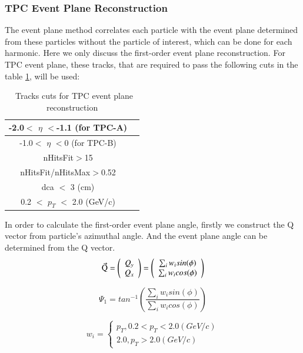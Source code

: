 \subsubsection{TPC Event Plane Reconstruction}
The event plane method correlates each particle with the event plane determined from these particles without the particle of interest, which can be done for each harmonic. Here we only discuss the first-order event plane reconstruction.
For TPC event plane, these tracks, that are required to pass the following cuts in the table \ref{tab:tpc_ep_cuts}, will be used:
\begin{table}[ht]
\caption{\ Tracks cuts for TPC event plane reconstruction}
\label{tab:tpc_ep_cuts}
\begin{tabular}{|c|c|}
\hline
-2.0$<$ $\eta$ $<$-1.1 (for TPC-A) \\ \hline
-1.0$<$ $\eta$ $<$0 (for TPC-B) \\ \hline
nHitsFit$>$15 \\ \hline
nHitsFit/nHitsMax$>$0.52 \\ \hline
dca $<$ 3 (cm) \\ \hline
0.2 $<$ $p_{T}$ $<$ 2.0 (GeV/c)\\ \hline
\end{tabular}
\end{table}
In order to calculate the first-order event plane angle, firstly we construct the Q vector from particle's azimuthal angle. And the event plane angle can be determined from the Q vector.
\begin{equation}
	\vec{\rm Q}=
	\left( \begin{array}{ccc}
		Q_{y} \\
		Q_{x}
	\end{array} \right)
	=
	\left( \begin{array}{ccc}
		\sum_{i}w_{i}sin(\phi) \\
		\sum_{i}w_{i}cos(\phi)
	\end{array} \right)
	\label{equ:Qvector}
\end{equation}

\begin{equation}
	\Psi_{1} = tan^{-1} \left( \frac{\sum_{i}w_{i}sin(\phi)}{\sum_{i}w_{i}cos(\phi)} \right)
	\label{equ:psi1_TPC}
\end{equation}

\begin{equation}
	w_{i} = 
	\begin{cases}
		p_{T}, 0.2<p_{T}<2.0 (GeV/c) \\
		2.0, p_{T} > 2.0 (GeV/c)
	\end{cases}
	\label{equ:weight_TPC}
\end{equation}

